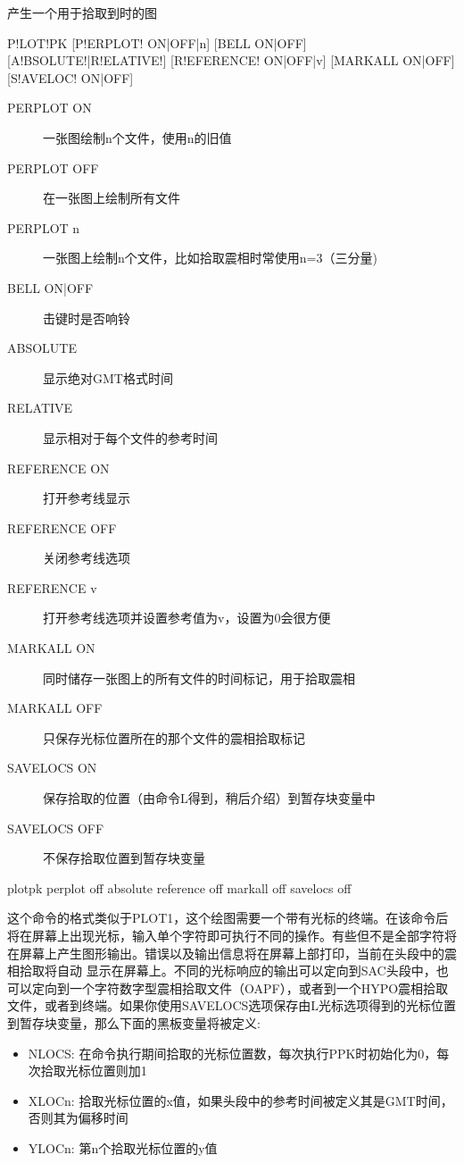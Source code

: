 \label{cmd:plotpk}

产生一个用于拾取到时的图

\begin{SACSTX}
P!LOT!PK [P!ERPLOT! ON|OFF|n] [BELL ON|OFF] [A!BSOLUTE!|R!ELATIVE!]
    [R!EFERENCE! ON|OFF|v] [MARKALL ON|OFF] [S!AVELOC! ON|OFF]
\end{SACSTX}

\begin{description}
\item [PERPLOT ON] 一张图绘制n个文件，使用n的旧值 
\item [PERPLOT OFF] 在一张图上绘制所有文件 
\item [PERPLOT n] 一张图上绘制n个文件，比如拾取震相时常使用n=3（三分量) 
\item [BELL ON|OFF]  击键时是否响铃 
\item [ABSOLUTE] 显示绝对GMT格式时间 
\item [RELATIVE] 显示相对于每个文件的参考时间 
\item [REFERENCE ON] 打开参考线显示 
\item [REFERENCE OFF] 关闭参考线选项 
\item [REFERENCE v] 打开参考线选项并设置参考值为v，设置为0会很方便 
\item [MARKALL ON] 同时储存一张图上的所有文件的时间标记，用于拾取震相 
\item [MARKALL OFF] 只保存光标位置所在的那个文件的震相拾取标记 
\item [SAVELOCS ON]  保存拾取的位置（由命令L得到，稍后介绍）到暂存块变量中 
\item [SAVELOCS OFF]  不保存拾取位置到暂存块变量 
\end{description}

\begin{SACDFT}
plotpk perplot off absolute reference off markall off savelocs off
\end{SACDFT}

这个命令的格式类似于PLOT1，这个绘图需要一个带有光标的终端。在该命令后将在屏幕上出现光标，输入单个字符即可执行不同的操作。有些但不是全部字符将在屏幕上产生图形输出。错误以及输出信息将在屏幕上部打印，当前在头段中的震相拾取将自动	显示在屏幕上。不同的光标响应的输出可以定向到SAC头段中，也可以定向到一个字符数字型震相拾取文件（OAPF），或者到一个HYPO震相拾取文件，或者到终端。如果你使用SAVELOCS选项保存由L光标选项得到的光标位置到暂存块变量，那么下面的黑板变量将被定义:
\begin{itemize}
\item NLOCS: 在命令执行期间拾取的光标位置数，每次执行PPK时初始化为0，每次拾取光标位置则加1
\item XLOCn: 拾取光标位置的x值，如果头段中的参考时间被定义其是GMT时间，否则其为偏移时间
\item YLOCn: 第n个拾取光标位置的y值
\end{itemize}

